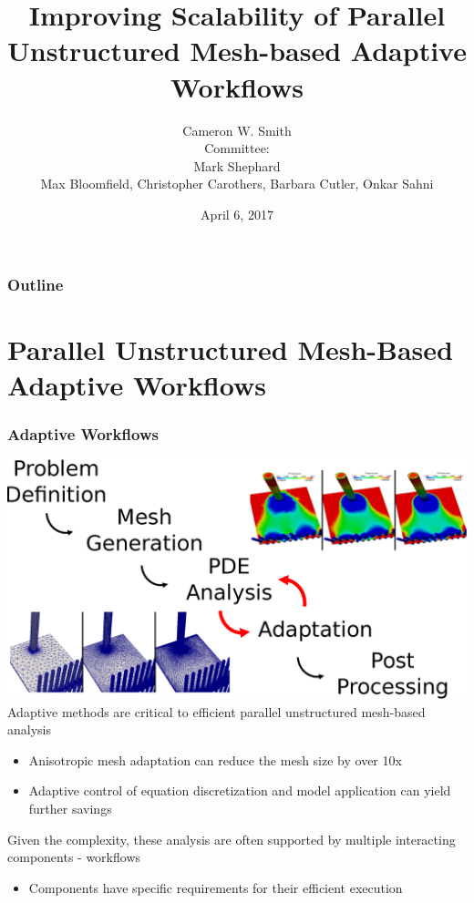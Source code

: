 \documentclass{beamer}
\begin{document}
\title[Unstructured Mesh Workflows]
{
Improving Scalability of Parallel Unstructured Mesh-based Adaptive Workflows
}
\author[smithc11@rpi.edu]{Cameron W. Smith\\
  \smallskip
  Committee:\\
  Mark Shephard\\
  Max Bloomfield, Christopher Carothers, Barbara Cutler, Onkar Sahni
}

\date{April 6, 2017}

\begin{frame}[plain]
  \titlepage
\end{frame}

\begin{frame}
  \frametitle{Outline}
  \tableofcontents
\end{frame}

\section{Parallel Unstructured Mesh-Based Adaptive Workflows}
\begin{frame}
  \frametitle{Adaptive Workflows}
  {\centering
    \smallskip
    \includegraphics[width=.6\textwidth]{figs/SimulationBasedEngineeringWorkflow2.eps}\\
  }
  \smallskip
  Adaptive methods are critical to efficient parallel unstructured mesh-based analysis
  \begin{itemize}
    \item Anisotropic mesh adaptation can reduce the mesh size by over 10x
    \item Adaptive control of equation discretization and model application can
      yield further savings
  \end{itemize}
  Given the complexity, these analysis are often supported by multiple
  interacting components - workflows
  \begin{itemize}
    \item Components have specific requirements for their efficient execution
  \end{itemize}
\end{frame}
\end{document}
